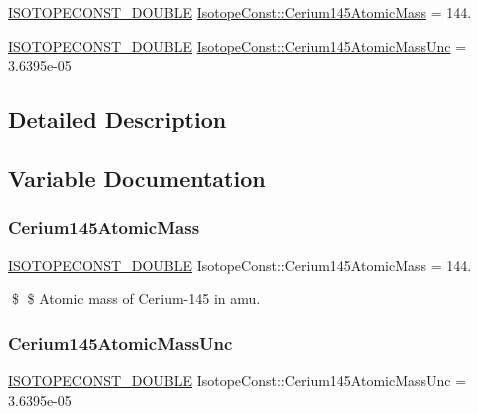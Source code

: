 \begin{DoxyCompactItemize}
\item 
\mbox{\hyperlink{group___isotope_const-_macros_ga8f45a7272ce02c0b4c65c44636ed719a}{I\+S\+O\+T\+O\+P\+E\+C\+O\+N\+S\+T\+\_\+\+D\+O\+U\+B\+LE}} \mbox{\hyperlink{group___isotope_const-_cerium-_ce145_ga92a3f50496aa96b1b6b18bad3baee59c}{Isotope\+Const\+::\+Cerium145\+Atomic\+Mass}} = 144.
\item 
\mbox{\hyperlink{group___isotope_const-_macros_ga8f45a7272ce02c0b4c65c44636ed719a}{I\+S\+O\+T\+O\+P\+E\+C\+O\+N\+S\+T\+\_\+\+D\+O\+U\+B\+LE}} \mbox{\hyperlink{group___isotope_const-_cerium-_ce145_ga3891f75169efc4cfc893a1283f1d1321}{Isotope\+Const\+::\+Cerium145\+Atomic\+Mass\+Unc}} = 3.\+6395e-\/05
\end{DoxyCompactItemize}


\subsection{Detailed Description}


\subsection{Variable Documentation}
\mbox{\label{group___isotope_const-_cerium-_ce145_ga92a3f50496aa96b1b6b18bad3baee59c}} 
\subsubsection{\texorpdfstring{Cerium145\+Atomic\+Mass}{Cerium145AtomicMass}}
{\footnotesize\ttfamily \mbox{\hyperlink{group___isotope_const-_macros_ga8f45a7272ce02c0b4c65c44636ed719a}{I\+S\+O\+T\+O\+P\+E\+C\+O\+N\+S\+T\+\_\+\+D\+O\+U\+B\+LE}} Isotope\+Const\+::\+Cerium145\+Atomic\+Mass = 144.}

\$ \$ Atomic mass of Cerium-\/145 in amu. \mbox{\label{group___isotope_const-_cerium-_ce145_ga3891f75169efc4cfc893a1283f1d1321}} 
\subsubsection{\texorpdfstring{Cerium145\+Atomic\+Mass\+Unc}{Cerium145AtomicMassUnc}}
{\footnotesize\ttfamily \mbox{\hyperlink{group___isotope_const-_macros_ga8f45a7272ce02c0b4c65c44636ed719a}{I\+S\+O\+T\+O\+P\+E\+C\+O\+N\+S\+T\+\_\+\+D\+O\+U\+B\+LE}} Isotope\+Const\+::\+Cerium145\+Atomic\+Mass\+Unc = 3.\+6395e-\/05}

